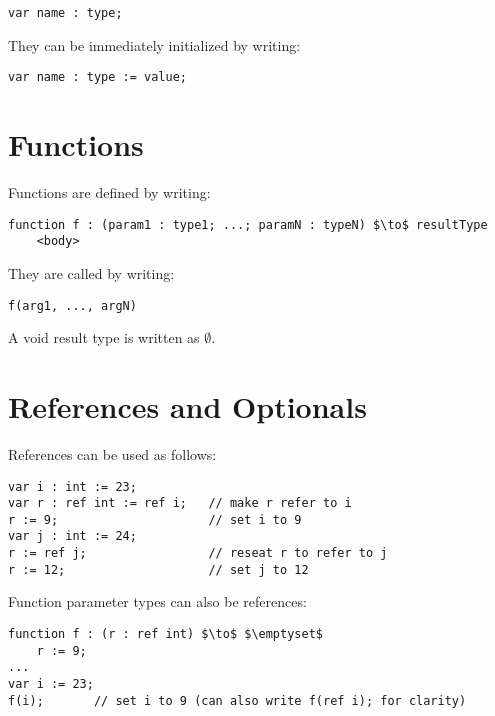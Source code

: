 \begin{lstlisting}[style=Snippet]
var name : type;
\end{lstlisting}
%
They can be immediately initialized by writing:

\begin{lstlisting}[style=Snippet]
var name : type := value;
\end{lstlisting}

\section{Functions}

Functions are defined by writing:

\begin{lstlisting}[style=Snippet]
function f : (param1 : type1; ...; paramN : typeN) $\to$ resultType
	<body>
\end{lstlisting}

\noindent They are called by writing:

\begin{lstlisting}[style=Snippet]
f(arg1, ..., argN)
\end{lstlisting}

\noindent A void result type is written as $\emptyset$.

\section{References and Optionals}

References can be used as follows:

\begin{lstlisting}[style=Snippet]
var i : int := 23;
var r : ref int := ref i;	// make r refer to i
r := 9;						// set i to 9
var j : int := 24;
r := ref j;					// reseat r to refer to j
r := 12;					// set j to 12
\end{lstlisting}

\noindent Function parameter types can also be references:

\begin{lstlisting}[style=Snippet]
function f : (r : ref int) $\to$ $\emptyset$
	r := 9;
...
var i := 23;
f(i);		// set i to 9 (can also write f(ref i); for clarity)
\end{lstlisting}

